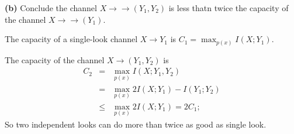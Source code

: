\documentclass[10pt]{article}
\begin{document}
\begin{tiny}
\begin{multicols}{3}
\textbf{(b)} Conclude the channel $X\rightarrow\rightarrow(Y_1,Y_2)$ is less thatn twice the capacity of the channel $X\rightarrow\rightarrow(Y_1)$.

The capacity of a single-look channel $X\rightarrow Y_1$ is $C_1 = \max_{p(x)} I(X;Y_1)$.

The capacity of the channel $X \rightarrow (Y_1,Y_2)$ is 
\begin{eqnarray*}
    C_2 &=& \max_{p(x)}I(X;Y_1,Y_2) \\
    &=& \max_{p(x)} 2I(X;Y_1) -I(Y_1; Y_2) \\
    &\le& \max_{p(x)}2I(X;Y_1) = 2C_1;
\end{eqnarray*}
So two independent looks can do more than twice as good as single look.



\end{multicols}
\end{tiny}
\end{document}
